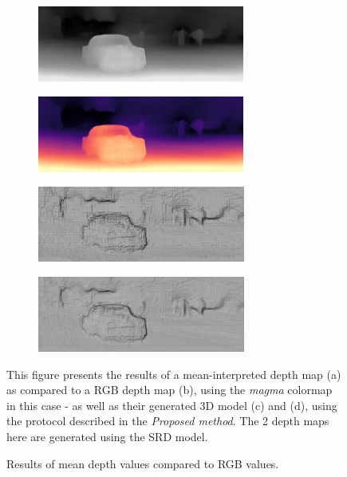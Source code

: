 \documentclass[12pt, letterpaper]{article}
\begin{document}
\begin{spacing}{1.15}
\begin{figure}[!ht]
    \begin{center}
        \begin{subfigure}[b]{0.45\textwidth}
            \includegraphics[height = 2.5cm]{test_disp}
            \caption{}
        \end{subfigure}
        \begin{subfigure}[b]{0.45\textwidth}
            \includegraphics[height = 2.5cm]{test_image_disp}
            \caption{}
        \end{subfigure}
        \begin{subfigure}[b]{0.45\textwidth}
            \includegraphics[height = 2.49cm]{3d_bw_depth}
            \caption{}
        \end{subfigure}
        \begin{subfigure}[b]{0.45\textwidth}
            \includegraphics[height = 2.49cm]{3dtest}
            \caption{}
        \end{subfigure}
        \caption{Results of mean depth values compared to RGB values.}
        \label{SRDcompare}
    \end{center}
    \small
    This figure presents the results of a mean-interpreted depth map (a) as compared to a RGB depth map (b), using the \emph{magma} colormap in this case - as well as their
    generated 3D model (c) and (d), using the protocol described in the \emph{Proposed method}. The 2 depth maps here are generated using the SRD model.
\end{figure}


\end{spacing}
\end{document}
